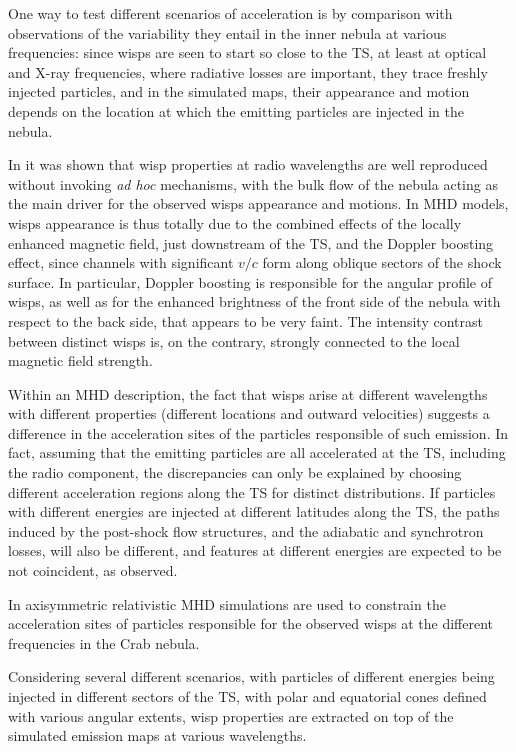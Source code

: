 One way to test different scenarios of acceleration is by comparison with observations of the variability they entail in the inner nebula at various frequencies: since wisps are seen to start so close to the TS, at least at optical and X-ray frequencies, where radiative losses are important, they trace freshly injected particles, and in the simulated maps, their appearance and motion depends on the location at which the emitting particles are injected in the nebula.

In \citet{Olmi:2014} it was shown that wisp properties at radio wavelengths are well reproduced without invoking \emph{ad hoc} mechanisms, with the bulk flow of the nebula acting as the main driver for the observed wisps appearance and motions. 
In MHD models, wisps appearance is thus totally due to the combined effects of the locally enhanced magnetic field, just downstream of the TS, and the Doppler boosting effect, since channels with significant $v/c$ form along oblique sectors of the shock surface.
In particular, Doppler boosting is responsible for the angular profile of wisps, as well as for the enhanced brightness of the front side of the nebula with respect to the back side, that appears to be very faint. 
The intensity contrast between distinct wisps is, on the contrary, strongly connected to the local magnetic field strength.

Within an MHD description, the fact that wisps arise at different wavelengths with different properties (different locations and outward velocities) suggests a difference in the acceleration sites of the particles responsible of such emission.
In fact, assuming that the emitting particles are all accelerated at the TS, including the radio component, the discrepancies can only be explained by choosing different acceleration regions along the TS for distinct distributions. 
If particles with different energies are injected at different latitudes along the TS, the paths induced by the post-shock flow structures, and the adiabatic and synchrotron losses, will also be different, and features at different energies are expected to be not coincident, as observed.

In \citet{Olmi:2015} axisymmetric relativistic  MHD simulations are used to constrain the acceleration sites of particles responsible for the observed wisps at the different frequencies in the Crab nebula. 

Considering several different scenarios, with particles of different energies being injected in different sectors of the TS, with polar and equatorial cones defined with various angular extents, wisp properties are extracted on top of the simulated emission maps at various wavelengths.

